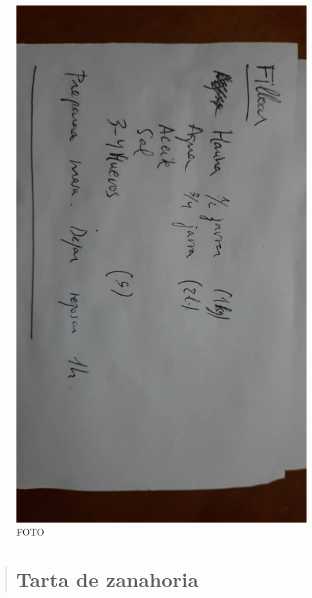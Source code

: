 \documentclass[
]{book}
\begin{document}
\begin{figure}
\centering
\includegraphics{images/filloas-receta.jpeg}
\caption{FOTO}
\end{figure}

\begin{quote}
\hypertarget{tarta-de-zanahoria}{%
\chapter{Tarta de zanahoria}\label{tarta-de-zanahoria}}
\end{quote}
\end{document}
